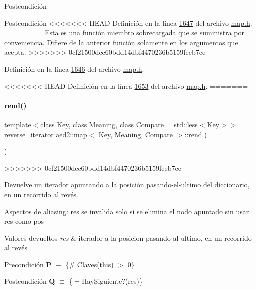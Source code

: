 \begin{DoxyPostcond}{\-Postcondición}
\begin{DoxyPostcond}{\-Postcondición}
<<<<<<< HEAD
\-Definición en la línea \hyperlink{map_8h_source_l01647}{1647} del archivo \hyperlink{map_8h_source}{map.\-h}.
=======
Esta es una función miembro sobrecargada que se suministra por conveniencia. Difiere de la anterior función solamente en los argumentos que acepta. 
>>>>>>> 0cf21500dcc60bdd14dbf4470236b5159feeb7ce

Definición en la línea \hyperlink{map_8h_source_l01646}{1646} del archivo \hyperlink{map_8h_source}{map.\+h}.

<<<<<<< HEAD
\-Definición en la línea \hyperlink{map_8h_source_l01653}{1653} del archivo \hyperlink{map_8h_source}{map.\-h}.
=======
\mbox{\label{classaed2_1_1map_a277f03b4f4b6b98879e4e4921081801f_a277f03b4f4b6b98879e4e4921081801f}} 
\paragraph{\texorpdfstring{rend()}{rend()}\hspace{0.1cm}{\footnotesize\ttfamily [1/2]}}
{\footnotesize\ttfamily template$<$class Key, class Meaning, class Compare = std\+::less$<$\+Key$>$$>$ \\
\hyperlink{classaed2_1_1map_a8e6a592062260177fd73b2f9897b1dd5_a8e6a592062260177fd73b2f9897b1dd5}{reverse\+\_\+iterator} \hyperlink{classaed2_1_1map}{aed2\+::map}$<$ Key, Meaning, Compare $>$\+::rend (\begin{DoxyParamCaption}{ }\end{DoxyParamCaption})\hspace{0.3cm}{\ttfamily [inline]}}
>>>>>>> 0cf21500dcc60bdd14dbf4470236b5159feeb7ce



Devuelve un iterador apuntando a la posición pasando-\/el-\/ultimo del diccionario, en un recorrido al revés. 

\begin{DoxyParagraph}{Aspectos de aliasing\+:}
res se invalida solo si se elimina el nodo apuntado sin usar res como pos
\end{DoxyParagraph}

\begin{DoxyRetVals}{Valores devueltos}
{\em res} & iterador a la posicion pasando-\/al-\/ultimo, en un recorrido al revés\\
\hline
\end{DoxyRetVals}
\begin{DoxyPrecond}{Precondición}
{\bfseries P} $\equiv$ \{\# Claves(this) $>$ 0\} 
\end{DoxyPrecond}
\begin{DoxyPostcond}{Postcondición}
{\bfseries Q} $\equiv$ \{ $\lnot$ Hay\+Siguiente?(res)\}
\end{DoxyPostcond}


\end{DoxyPostcond}
\end{DoxyPostcond}
